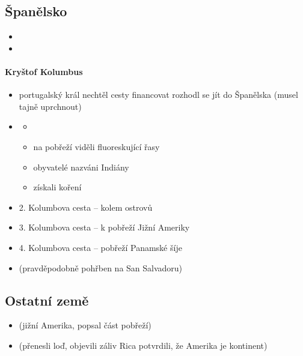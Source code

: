 \subsection{Španělsko}
\begin{itemize}
\item {}
\item {}
\end{itemize}

\paragraph{Kryštof Kolumbus}
\begin{itemize}
\item portugalský král nechtěl cesty financovat \ra rozhodl se jít do Španělska (musel tajně uprchnout)
\item \textbf{}
	\begin{itemize}
	\item {}
	\item na pobřeží viděli fluoreskující řasy
	\item obyvatelé nazváni Indiány
	\item získali koření
	\end{itemize}
\item 2. Kolumbova cesta -- kolem ostrovů
\item 3. Kolumbova cesta -- k pobřeží Jižní Ameriky
\item 4. Kolumbova cesta -- pobřeží Panamské šíje
\item {} (pravděpodobně pohřben na San Salvadoru)
\end{itemize}

\subsection{Ostatní země}
\begin{itemize}
\item {} (jižní Amerika, popsal část pobřeží)
\item {} (přenesli loď, objevili záliv Rica \ra potvrdili, že Amerika je kontinent)
\end{itemize}

